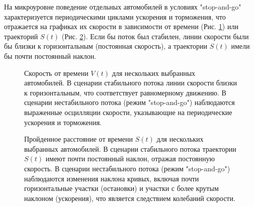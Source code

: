\documentclass[12pt, a4paper]{article}
\begin{document}

На микроуровне поведение отдельных автомобилей в условиях "stop-and-go" характеризуется периодическими циклами ускорения и торможения, что отражается на графиках их скорости в зависимости от времени (Рис. \ref{fig:velocity_time_oscillations}) или траекторий $S(t)$ (Рис. \ref{fig:distance_time_oscillations}). Если бы поток был стабилен, линии скорости были бы близки к горизонтальным (постоянная скорость), а траектории $S(t)$ имели бы почти постоянный наклон.

\begin{figure}[h!]
	\centering
	\caption{Скорость от времени $V(t)$ для нескольких выбранных автомобилей. В сценарии стабильного потока линии скорости близки к горизонтальным, что соответствует равномерному движению. В сценарии нестабильного потока (режим "stop-and-go") наблюдаются выраженные осцилляции скорости, указывающие на периодические ускорения и торможения.}
	\label{fig:velocity_time_oscillations}
\end{figure}

\begin{figure}[h!]
	\centering
	\caption{Пройденное расстояние от времени $S(t)$ для нескольких выбранных автомобилей. В сценарии стабильного потока траектории $S(t)$ имеют почти постоянный наклон, отражая постоянную скорость. В сценарии нестабильного потока (режим "stop-and-go") наблюдаются изменения наклона кривых, включая почти горизонтальные участки (остановки) и участки с более крутым наклоном (ускорения), что является следствием колебаний скорости.}
	\label{fig:distance_time_oscillations}
\end{figure}
\end{document}
